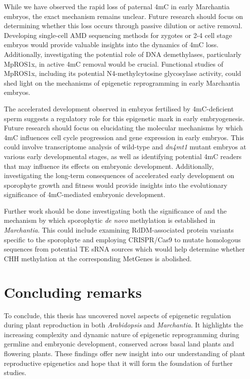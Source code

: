 While we have observed the rapid loss of paternal 4mC in early Marchantia embryos, the exact mechanism remains unclear. Future research should focus on determining whether this loss occurs through passive dilution or active removal. Developing single-cell AMD sequencing methods for zygotes or 2-4 cell stage embryos would provide valuable insights into the dynamics of 4mC loss. Additionally, investigating the potential role of DNA demethylases, particularly MpROS1x, in active 4mC removal would be crucial. Functional studies of MpROS1x, including its potential N4-methylcytosine glycosylase activity, could shed light on the mechanisms of epigenetic reprogramming in early Marchantia embryos.

The accelerated development observed in embryos fertilised by 4mC-deficient sperm suggests a regulatory role for this epigenetic mark in early embryogenesis. Future research should focus on elucidating the molecular mechanisms by which 4mC influences cell cycle progression and gene expression in early embryos. This could involve transcriptome analysis of wild-type and \textit{dn4mt1} mutant embryos at various early developmental stages, as well as identifying potential 4mC readers that may influence its effects on embryonic development. Additionally, investigating the long-term consequences of accelerated early development on sporophyte growth and fitness would provide insights into the evolutionary significance of 4mC-mediated embryonic development. 

Further work should be done investigating both the significance of and the mechanism by which sporophytic \textit{de novo} methylation is established in \textit{Marchantia}. This could include examining RdDM-associated protein variants specific to the sporophyte and employing CRISPR/Cas9 to mutate homologous sequences from potential TE sRNA sources which would help determine whether CHH methylation at the corresponding MetGenes is abolished.

\section{Concluding remarks}

To conclude,  this thesis has uncovered novel aspects of epigenetic regulation during plant reproduction in both \textit{Arabidopsis} and \textit{Marchantia}. It highlights the increasing complexity and dynamic nature of epigenetic reprogramming during germline and embryonic development, conserved across basal land plants and flowering plants. These findings offer new insight into our understanding of plant reproductive epigenetics and hope that it will form the foundation of further studies.